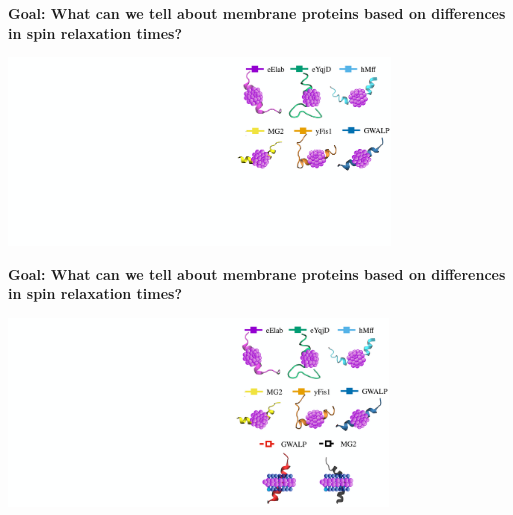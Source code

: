 \documentclass{beamer}
\begin{document}
\addtocounter{framenumber}{-1}
\begin{frame}
\begin{center}
\Large{\centering
\textbf{Goal: What can we tell about membrane proteins based on differences in spin relaxation times?} \\}

\vspace{0.5cm}

\includegraphics[height=5cm]{can_we1.pdf}
\end{center}
\end{frame}

\addtocounter{framenumber}{-1}
\begin{frame}
\begin{center}
\Large{\centering
\textbf{Goal: What can we tell about membrane proteins based on differences in spin relaxation times?} \\}

\vspace{0.5cm}

\includegraphics[height=5cm]{can_we2.pdf}
\end{center}
\end{frame}
\end{document}
